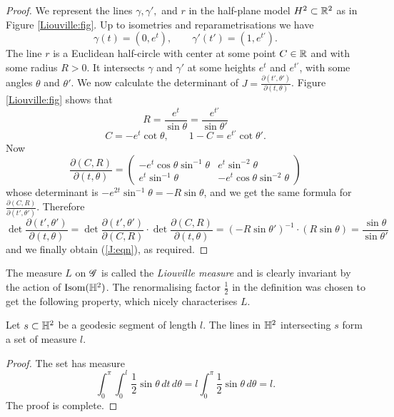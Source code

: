\begin{proof}
We represent the lines $\gamma, \gamma',$ and $r$ in the half-plane model $H^2\subset \mathbb{R}^2$ as in Figure \ref{Liouville:fig}. Up to isometries and reparametrisations we have 
$$\gamma(t) = (0, e^t), \qquad \gamma'(t') = (1,e^{t'}).$$
The line $r$ is a Euclidean half-circle with center at some point $C\in \mathbb{R}$ and with some radius $R>0$. It intersects $\gamma$ and $\gamma'$ at some heights $e^t$ and $e^{t'}$, with some angles $\theta$ and $\theta'$. We now calculate the determinant of $J = \frac{\partial (t', \theta')}{\partial (t,\theta)}$. Figure \ref{Liouville:fig} shows that
$$ R = \frac{e^t}{\sin \theta} = \frac{e^{t'}}{\sin \theta'}$$
$$ C = -e^t \cot \theta, \qquad 1 - C = e^{t'} \cot \theta'.$$
Now
$$\frac{\partial (C,R)}{\partial(t,\theta)} = 
\begin{pmatrix} 
-e^t\cos\theta\sin^{-1}\theta & e^t\sin^{-2}\theta \\
e^t\sin^{-1}\theta & -e^t \cos\theta\sin^{-2} \theta
\end{pmatrix}
$$
whose determinant is $-e^{2t} \sin^{-1}\theta = -R\sin\theta$, and we get the same formula for $\frac{\partial (C,R)}{\partial(t',\theta')}$. Therefore
$$\det \frac{\partial (t', \theta')}{\partial (t,\theta)} =
\det \frac{\partial (t', \theta')}{\partial (C, R)}
\cdot 
\det \frac{\partial (C,R)}{\partial(t,\theta)} 
=
(-R\sin\theta')^{-1} \cdot (R \sin\theta) = \frac{\sin\theta}{\sin\theta'}$$
and we finally obtain (\ref{J:eqn}), as required.
\end{proof}
The measure $L$ on $\mathscr{G}$ is called the \emph{Liouville measure} and is clearly invariant by the action of ${\rm Isom}(\mathbb{H}^2)$. The renormalising factor $\frac 12$ in the definition was chosen to get the following property, which nicely characterises $L$.

\begin{prop} \label{l:prop}
Let $s\subset \mathbb{H}^2$ be a geodesic segment of length $l$. The lines in $\mathbb{H}^2$ intersecting $s$ form a set of measure $l$.
\end{prop}
\begin{proof}
The set has measure
$$\int_0^\pi\int_0^l \frac 12 \sin\theta \, dt\, d\theta = l \int_0^\pi \frac 12 \sin \theta \, d\theta = l.$$
The proof is complete.
\end{proof}

